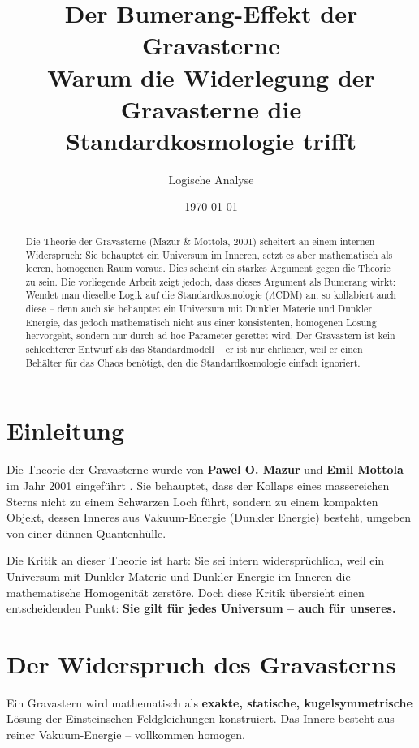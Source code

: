 \documentclass[12pt,a4paper]{article}
\title{Der Bumerang-Effekt der Gravasterne \\
\large Warum die Widerlegung der Gravasterne die Standardkosmologie trifft}
\author{Logische Analyse}
\date{\today}
\begin{document}
\maketitle

\begin{abstract}
Die Theorie der Gravasterne (Mazur \& Mottola, 2001) scheitert an einem internen Widerspruch: Sie behauptet ein Universum im Inneren, setzt es aber mathematisch als leeren, homogenen Raum voraus. Dies scheint ein starkes Argument gegen die Theorie zu sein. Die vorliegende Arbeit zeigt jedoch, dass dieses Argument als Bumerang wirkt: Wendet man dieselbe Logik auf die Standardkosmologie ($\Lambda$CDM) an, so kollabiert auch diese – denn auch sie behauptet ein Universum mit Dunkler Materie und Dunkler Energie, das jedoch mathematisch nicht aus einer konsistenten, homogenen Lösung hervorgeht, sondern nur durch ad-hoc-Parameter gerettet wird. Der Gravastern ist kein schlechterer Entwurf als das Standardmodell – er ist nur ehrlicher, weil er einen Behälter für das Chaos benötigt, den die Standardkosmologie einfach ignoriert.
\end{abstract}

\section{Einleitung}

Die Theorie der Gravasterne wurde von \textbf{Pawel O. Mazur} und \textbf{Emil Mottola} im Jahr 2001 eingeführt \cite{Mazur2001, Mazur2004}. Sie behauptet, dass der Kollaps eines massereichen Sterns nicht zu einem Schwarzen Loch führt, sondern zu einem kompakten Objekt, dessen Inneres aus Vakuum-Energie (Dunkler Energie) besteht, umgeben von einer dünnen Quantenhülle.

Die Kritik an dieser Theorie ist hart: Sie sei intern widersprüchlich, weil ein Universum mit Dunkler Materie und Dunkler Energie im Inneren die mathematische Homogenität zerstöre. Doch diese Kritik übersieht einen entscheidenden Punkt: \textbf{Sie gilt für jedes Universum – auch für unseres.}

\section{Der Widerspruch des Gravasterns}

Ein Gravastern wird mathematisch als \textbf{exakte, statische, kugelsymmetrische} Lösung der Einsteinschen Feldgleichungen konstruiert. Das Innere besteht aus reiner Vakuum-Energie – vollkommen homogen.
\end{document}

